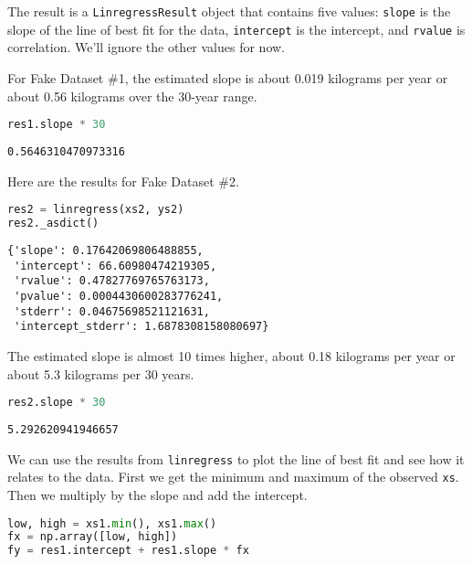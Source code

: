 The result is a \passthrough{\lstinline!LinregressResult!} object that
contains five values: \passthrough{\lstinline!slope!} is the slope of
the line of best fit for the data, \passthrough{\lstinline!intercept!}
is the intercept, and \passthrough{\lstinline!rvalue!} is correlation.
We'll ignore the other values for now.

For Fake Dataset \#1, the estimated slope is about 0.019 kilograms per
year or about 0.56 kilograms over the 30-year range.

\begin{lstlisting}[language=Python,style=source]
res1.slope * 30
\end{lstlisting}

\begin{lstlisting}[style=output]
0.5646310470973316
\end{lstlisting}

Here are the results for Fake Dataset \#2.

\begin{lstlisting}[language=Python,style=source]
res2 = linregress(xs2, ys2)
res2._asdict()
\end{lstlisting}

\begin{lstlisting}[style=output]
{'slope': 0.17642069806488855,
 'intercept': 66.60980474219305,
 'rvalue': 0.47827769765763173,
 'pvalue': 0.0004430600283776241,
 'stderr': 0.04675698521121631,
 'intercept_stderr': 1.6878308158080697}
\end{lstlisting}

The estimated slope is almost 10 times higher, about 0.18 kilograms per
year or about 5.3 kilograms per 30 years.

\begin{lstlisting}[language=Python,style=source]
res2.slope * 30
\end{lstlisting}

\begin{lstlisting}[style=output]
5.292620941946657
\end{lstlisting}

We can use the results from \passthrough{\lstinline!linregress!} to plot
the line of best fit and see how it relates to the data. First we get
the minimum and maximum of the observed \passthrough{\lstinline!xs!}.
Then we multiply by the slope and add the intercept.

\begin{lstlisting}[language=Python,style=source]
low, high = xs1.min(), xs1.max()
fx = np.array([low, high])
fy = res1.intercept + res1.slope * fx
\end{lstlisting}

